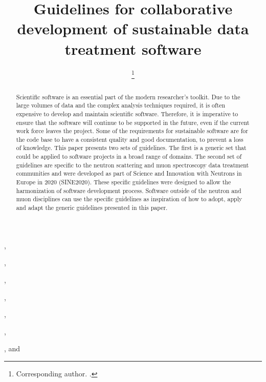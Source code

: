 \documentclass[jnr]{iosart2x}
\begin{document}
\begin{frontmatter}

\title{Guidelines for collaborative development of sustainable data treatment software}

\author[A]{ %
\thanks{Corresponding author. .}},
\author[A]{ },
\author[C]{ },
\author[D]{ },
\author[A]{ },
\author[E]{ },
\author[A]{ },
and
\author[B]{ }

\address[A]{,}
\address[B]{,}
\address[C]{,}
\address[D]{,}
\address[E]{,}

\begin{abstract}
Scientific software is an essential part of the modern researcher's toolkit.
Due to the large volumes of data and the complex analysis techniques required, it is often expensive to develop and maintain scientific software.
Therefore, it is imperative to ensure that the software will continue to be supported in the future, even if the current work force leaves the project.
Some of the requirements for sustainable software are for the code base to have a consistent quality and good documentation, to prevent a loss of knowledge.
This paper presents two sets of guidelines.
The first is a generic set that could be applied to software projects in a broad range of domains.
The second set of guidelines are specific to the neutron scattering and muon spectroscopy data treatment communities and were developed as part of Science and Innovation with Neutrons in Europe in 2020 (SINE2020).
These specific guidelines were designed to allow the harmonization of software development process.
Software outside of the neutron and muon disciplines can use the specific guidelines as inspiration of how to adopt, apply and adapt the generic guidelines presented in this paper.
\end{abstract}


\end{frontmatter}
\end{document}
